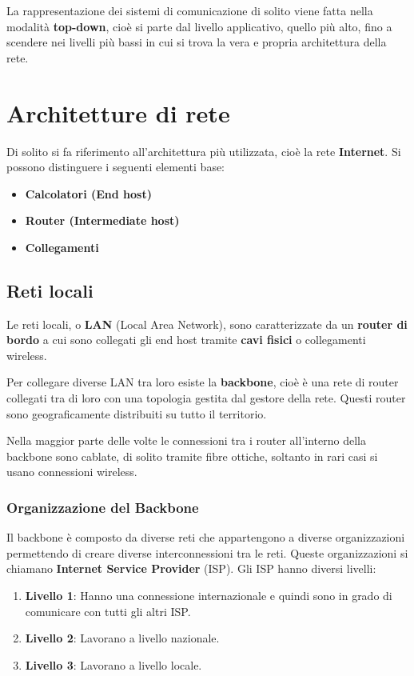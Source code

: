 \documentclass[a4paper]{article}
\begin{document}
\noindent
La rappresentazione dei sistemi di comunicazione di solito viene fatta nella modalità
\textbf{top-down}, cioè si parte dal livello applicativo, quello più alto, fino a scendere
nei livelli più bassi in cui si trova la vera e propria architettura della rete.

\section{Architetture di rete}
Di solito si fa riferimento all'architettura più utilizzata, cioè la rete
\textbf{Internet}. Si possono distinguere i seguenti elementi base:
\begin{itemize}
  \item \textbf{Calcolatori (End host)}
  \item \textbf{Router (Intermediate host)}
  \item \textbf{Collegamenti}
\end{itemize}

\subsection{Reti locali}
Le reti locali, o \textbf{LAN} (Local Area Network), sono caratterizzate da un
\textbf{router di bordo} a cui sono collegati gli end host tramite \textbf{cavi fisici}
o collegamenti wireless.
\label{09-10-D1}

\vspace{1em}
\noindent
Per collegare diverse LAN tra loro esiste la \textbf{backbone}, cioè è una rete
di router collegati tra di loro con una topologia
gestita dal gestore della rete. Questi router sono geograficamente distribuiti
su tutto il territorio.
\label{09-10-D2}

\noindent
Nella maggior parte delle volte le connessioni tra i router all'interno della
backbone sono cablate, di solito tramite fibre ottiche, soltanto in rari casi
si usano connessioni wireless.

\subsubsection{Organizzazione del Backbone}
Il backbone è composto da diverse reti che appartengono a diverse organizzazioni
permettendo di creare diverse interconnessioni tra le reti. Queste organizzazioni
si chiamano \textbf{Internet Service Provider} (ISP). Gli ISP hanno diversi livelli:
\begin{enumerate}
  \item \textbf{Livello 1}: Hanno una connessione internazionale
    e quindi sono in grado di comunicare con tutti gli altri ISP.
  \item \textbf{Livello 2}: Lavorano a livello nazionale.
  \item \textbf{Livello 3}: Lavorano a livello locale.
\end{enumerate}
\end{document}
